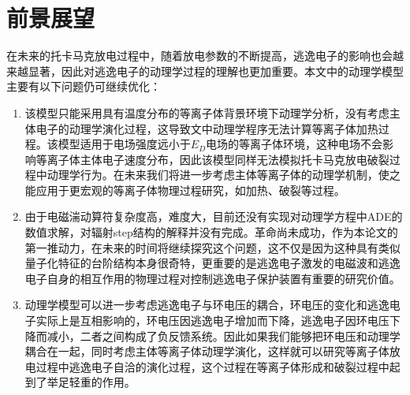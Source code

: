 \section{前景展望}
在未来的托卡马克放电过程中，随着放电参数的不断提高，逃逸电子的影响也会越来越显著，因此对逃逸电子的动理学过程的理解也更加重要。本文中的动理学模型主要有以下问题仍可继续优化：
\begin{enumerate}
\item
该模型只能采用具有温度分布的等离子体背景环境下动理学分析，没有考虑主体电子的动理学演化过程，这导致文中动理学程序无法计算等离子体加热过程。该模型适用于电场强度远小于$E_D$电场的等离子体环境，这种电场不会影响等离子体主体电子速度分布，因此该模型同样无法模拟托卡马克放电破裂过程中动理学行为。在未来我们将进一步考虑主体等离子体的动理学机制，使之能应用于更宏观的等离子体物理过程研究，如加热、破裂等过程。
\item
由于电磁湍动算符复杂度高，难度大，目前还没有实现对动理学方程中ADE的数值求解，对辐射step结构的解释并没有完成。革命尚未成功，作为本论文的第一推动力，在未来的时间将继续探究这个问题，这不仅是因为这种具有类似量子化特征的台阶结构本身很奇特，更重要的是逃逸电子激发的电磁波和逃逸电子自身的相互作用的物理过程对控制逃逸电子保护装置有重要的研究价值。
\item

动理学模型可以进一步考虑逃逸电子与环电压的耦合，环电压的变化和逃逸电子实际上是互相影响的，环电压因逃逸电子增加而下降，逃逸电子因环电压下降而减小，二者之间构成了负反馈系统。因此如果我们能够把环电压和动理学耦合在一起，同时考虑主体等离子体动理学演化，这样就可以研究等离子体放电过程中逃逸电子自洽的演化过程，这个过程在等离子体形成和破裂过程中起到了举足轻重的作用。

\end{enumerate}






























